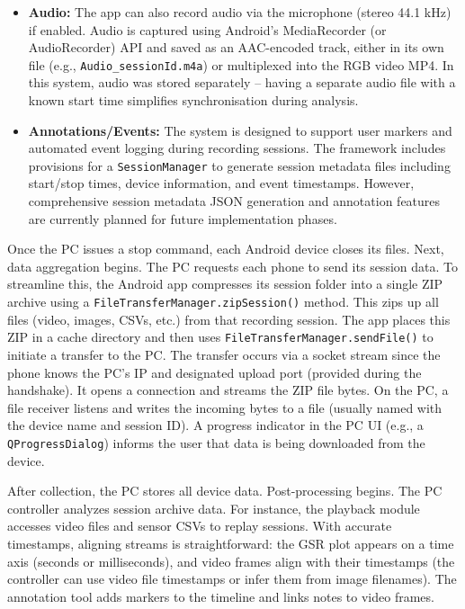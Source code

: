 \begin{itemize}
	\item \textbf{Audio:} The app can also record audio via the microphone (stereo 44.1 kHz) if enabled. Audio is captured using Android's MediaRecorder (or AudioRecorder) API and saved as an AAC-encoded track, either in its own file (e.g., \texttt{Audio\_\<sessionId\>.m4a}) or multiplexed into the RGB video MP4. In this system, audio was stored separately -- having a separate audio file with a known start time simplifies synchronisation during analysis.
	\item \textbf{Annotations/Events:} The system is designed to support user markers and automated event logging during recording sessions. The framework includes provisions for a \texttt{SessionManager} to generate session metadata files including start/stop times, device information, and event timestamps. However, comprehensive session metadata JSON generation and annotation features are currently planned for future implementation phases.
\end{itemize}

Once the PC issues a stop command, each Android device closes its files. Next, data aggregation begins. The PC requests each phone to send its session data. To streamline this, the Android app compresses its session folder into a single ZIP archive using a \texttt{FileTransferManager.zipSession()} method. This zips up all files (video, images, CSVs, etc.) from that recording session. The app places this ZIP in a cache directory and then uses \texttt{FileTransferManager.sendFile()} to initiate a transfer to the PC. The transfer occurs via a socket stream \textemdash since the phone knows the PC's IP and designated upload port (provided during the handshake). It opens a connection and streams the ZIP file bytes. On the PC, a file receiver listens and writes the incoming bytes to a file (usually named with the device name and session ID). A progress indicator in the PC UI (e.g., a \texttt{QProgressDialog}) informs the user that data is being downloaded from the device.

After collection, the PC stores all device data. Post-processing begins. The PC controller analyzes session archive data. For instance, the playback module accesses video files and sensor CSVs to replay sessions. With accurate timestamps, aligning streams is straightforward: the GSR plot appears on a time axis (seconds or milliseconds), and video frames align with their timestamps (the controller can use video file timestamps or infer them from image filenames). The annotation tool adds markers to the timeline and links notes to video frames.


